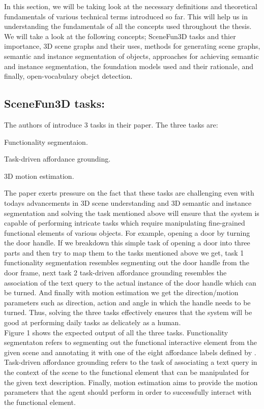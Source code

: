 In this section, we will be taking look at the necessary definitions and theoretical fundamentals of various technical terms introduced so far. 
This will help us in understanding the fundamentals of all the concepts used throughout the thesis. We will take a look at the following concepts; 
SceneFun3D tasks and thier importance, 3D scene graphs and their uses, methods for generating scene graphs, semantic and instance segmentation of objects, 
approaches for achieving semantic and instance segmentation, the foundation models used and their rationale, and finally, open-vocabulary obejct detection.

\subsection{SceneFun3D tasks:}
The authors of \cite{scenefun3D} introduce 3 tasks in their paper. The three tasks are:
\begin{compactenum}[1.]
\item	Functionality segmentaion.
\item	Task-driven affordance grounding.
\item	3D motion estimation.
\end{compactenum}
The paper exerts pressure on the fact that these tasks are challenging even with todays advancements in 3D scene understanding
and 3D semantic and instance segmentation and solving the task mentioned above will ensure that the system is capable of 
performing intricate tasks which require manipulating fine-grained functional elements of various objects.
For example, opening a door by turning the door handle. If we breakdown this simple task of opening a door into three parts
and then try to map them to the tasks mentioned above we get, task 1 functionality segmentation resembles segmenting out the door handle 
from the door frame, next task 2 task-driven affordance grounding resembles the association of the text query to the actual 
instance of the door handle which can be turned. And finally with motion estimation we get the direction/motion parameters such as direction, action and angle 
in which the handle needs to be turned. Thus, solving the three tasks effectively ensures that the system will be good at performing daily
tasks as delicately as a human. \\
Figure 1 shows the expected output of all the three tasks. Functionality segmentaton refers to segmenting out the functional interactive 
element from the given scene and annotating it with one of the eight affordance labels defined by \cite{gibson}. Task-driven affordance grounding refers to the task
of associating a text query in the context of the scene to the functional element that can be manipulated for the given text description. Finally, motion estimation
aims to provide the motion parameters that the agent should perform in order to successfully interact with the functional element.

